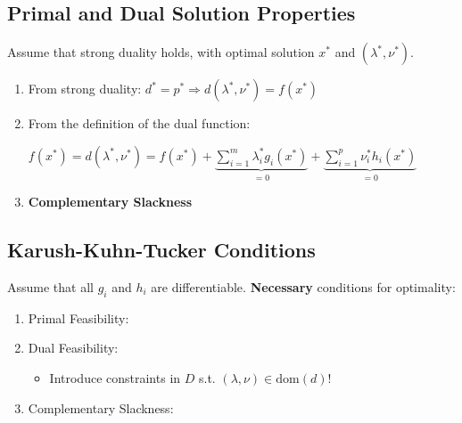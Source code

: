 \documentclass[8pt,a4paper]{scrartcl}
\begin{document}
\begin{multicols*}{3}
\begin{multicols*}{4}

\subsection{Primal and Dual Solution Properties}

Assume that strong duality holds, with optimal solution $x^\ast$ and $(\lambda^\ast,\nu^\ast)$.

\begin{enumerate}

\item From strong duality: $d^\ast=p^\ast\Rightarrow d(\lambda^\ast,\nu^\ast)=f(x^\ast)$
\item From the definition of the dual function:

$f(x^\ast)=d(\lambda^\ast,\nu^\ast)=f(x^\ast)+\underbrace{\sum\limits_{i=1}^m\lambda_i^\ast g_i(x^\ast)}_{=0}+\underbrace{\sum\limits_{i=1}^p\nu_i^\ast h_i(x^\ast)}_{=0}$
\item \textbf{Complementary Slackness}

\end{enumerate}

\subsection{Karush-Kuhn-Tucker Conditions}

Assume that all $g_i$ and $h_i$ are differentiable. \textbf{Necessary} conditions for optimality:

\begin{enumerate}

\item Primal Feasibility:

\item Dual Feasibility:


\begin{itemize}
\item Introduce constraints in $D$ s.t. $(\lambda,\nu)\in\text{dom}(d)$!
\end{itemize}
\item Complementary Slackness:


\end{enumerate}
\end{multicols*}
\end{multicols*}
\end{document}
